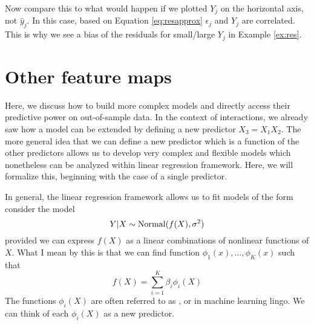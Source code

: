 Now compare this to what would happen if we plotted $Y_j$ on the horizontal axis, not $\hat{y}_j$. In this case, based on Equation \ref{eq:resapprox} $\epsilon_j$ and $Y_j$ are correlated. This is why we see a bias of the residuals for small/large $Y_j$ in Example \ref{ex:res}. 






\section{Other feature maps}

 Here, we discuss how to build more complex models and directly access their predictive power on out-of-sample data. 
In the context of interactions, we already saw how a model can be extended by defining a new predictor $X_3 = X_1X_2$. The more general idea that we can define a new predictor which is a function of the other predictors allows us to develop very complex and flexible models which nonetheless can be analyzed within linear regression framework. Here, we will formalize this, beginning with the case of a single predictor. 

In general, the linear regression framework allows us to fit models of the form consider the model
\begin{equation}\label{eq:nlgauss}
Y|X \sim {\rm Normal}( f(X),\sigma^2)
\end{equation}
provided we can express $f(X)$ as a linear combinations of nonlinear functions of $X$. What I mean by this is that we can find function $\phi_1(x),\dots,\phi_K(x)$ such that 
\begin{equation*}
f(X) = \sum_{i=1}^K \beta_i\phi_i(X)
\end{equation*}
The functions $\phi_i(X)$ are often referred to as , or  in machine learning lingo. We can think of each $\phi_i(X)$ as a new predictor. 



